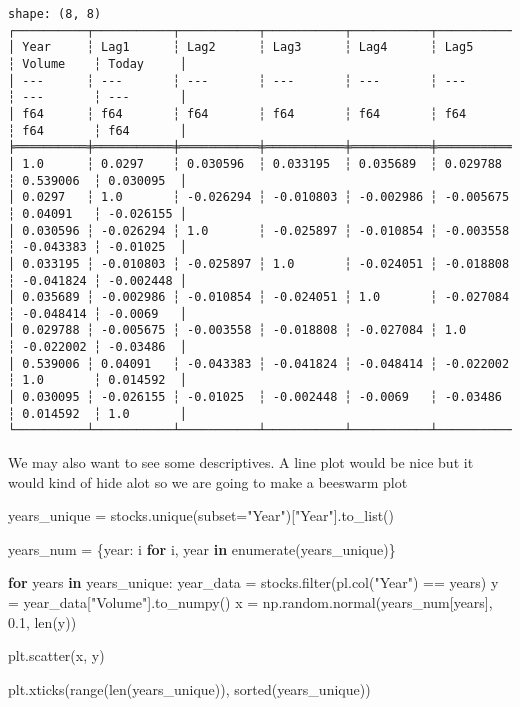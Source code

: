 \documentclass[
  letterpaper,
  DIV=11,
  numbers=noendperiod]{scrreprt}
\newenvironment{Shaded}{\begin{snugshade}}{\end{snugshade}}
\newcommand{\BuiltInTok}[1]{\textcolor[rgb]{0.00,0.23,0.31}{#1}}
\newcommand{\ControlFlowTok}[1]{\textcolor[rgb]{0.00,0.23,0.31}{\textbf{#1}}}
\newcommand{\FloatTok}[1]{\textcolor[rgb]{0.68,0.00,0.00}{#1}}
\newcommand{\KeywordTok}[1]{\textcolor[rgb]{0.00,0.23,0.31}{\textbf{#1}}}
\newcommand{\NormalTok}[1]{\textcolor[rgb]{0.00,0.23,0.31}{#1}}
\newcommand{\OperatorTok}[1]{\textcolor[rgb]{0.37,0.37,0.37}{#1}}
\newcommand{\StringTok}[1]{\textcolor[rgb]{0.13,0.47,0.30}{#1}}
\begin{document}
\begin{verbatim}
shape: (8, 8)
┌──────────┬───────────┬───────────┬───────────┬───────────┬───────────┬───────────┬───────────┐
│ Year     ┆ Lag1      ┆ Lag2      ┆ Lag3      ┆ Lag4      ┆ Lag5      ┆ Volume    ┆ Today     │
│ ---      ┆ ---       ┆ ---       ┆ ---       ┆ ---       ┆ ---       ┆ ---       ┆ ---       │
│ f64      ┆ f64       ┆ f64       ┆ f64       ┆ f64       ┆ f64       ┆ f64       ┆ f64       │
╞══════════╪═══════════╪═══════════╪═══════════╪═══════════╪═══════════╪═══════════╪═══════════╡
│ 1.0      ┆ 0.0297    ┆ 0.030596  ┆ 0.033195  ┆ 0.035689  ┆ 0.029788  ┆ 0.539006  ┆ 0.030095  │
│ 0.0297   ┆ 1.0       ┆ -0.026294 ┆ -0.010803 ┆ -0.002986 ┆ -0.005675 ┆ 0.04091   ┆ -0.026155 │
│ 0.030596 ┆ -0.026294 ┆ 1.0       ┆ -0.025897 ┆ -0.010854 ┆ -0.003558 ┆ -0.043383 ┆ -0.01025  │
│ 0.033195 ┆ -0.010803 ┆ -0.025897 ┆ 1.0       ┆ -0.024051 ┆ -0.018808 ┆ -0.041824 ┆ -0.002448 │
│ 0.035689 ┆ -0.002986 ┆ -0.010854 ┆ -0.024051 ┆ 1.0       ┆ -0.027084 ┆ -0.048414 ┆ -0.0069   │
│ 0.029788 ┆ -0.005675 ┆ -0.003558 ┆ -0.018808 ┆ -0.027084 ┆ 1.0       ┆ -0.022002 ┆ -0.03486  │
│ 0.539006 ┆ 0.04091   ┆ -0.043383 ┆ -0.041824 ┆ -0.048414 ┆ -0.022002 ┆ 1.0       ┆ 0.014592  │
│ 0.030095 ┆ -0.026155 ┆ -0.01025  ┆ -0.002448 ┆ -0.0069   ┆ -0.03486  ┆ 0.014592  ┆ 1.0       │
└──────────┴───────────┴───────────┴───────────┴───────────┴───────────┴───────────┴───────────┘
\end{verbatim}

We may also want to see some descriptives. A line plot would be nice but
it would kind of hide alot so we are going to make a beeswarm plot

\begin{Shaded}
\begin{Highlighting}[]
\NormalTok{years\_unique }\OperatorTok{=}\NormalTok{ stocks.unique(subset}\OperatorTok{=}\StringTok{"Year"}\NormalTok{)[}\StringTok{"Year"}\NormalTok{].to\_list()}

\NormalTok{years\_num }\OperatorTok{=}\NormalTok{ \{year: i }\ControlFlowTok{for}\NormalTok{ i, year }\KeywordTok{in} \BuiltInTok{enumerate}\NormalTok{(years\_unique)\}}

\ControlFlowTok{for}\NormalTok{ years }\KeywordTok{in}\NormalTok{ years\_unique:}
\NormalTok{    year\_data }\OperatorTok{=}\NormalTok{ stocks.}\BuiltInTok{filter}\NormalTok{(pl.col(}\StringTok{"Year"}\NormalTok{) }\OperatorTok{==}\NormalTok{ years)}
\NormalTok{    y }\OperatorTok{=}\NormalTok{ year\_data[}\StringTok{"Volume"}\NormalTok{].to\_numpy()}
\NormalTok{    x }\OperatorTok{=}\NormalTok{ np.random.normal(years\_num[years], }\FloatTok{0.1}\NormalTok{, }\BuiltInTok{len}\NormalTok{(y))}

\NormalTok{    plt.scatter(x, y)}


\NormalTok{plt.xticks(}\BuiltInTok{range}\NormalTok{(}\BuiltInTok{len}\NormalTok{(years\_unique)), }\BuiltInTok{sorted}\NormalTok{(years\_unique))}
\end{Highlighting}
\end{Shaded}
\end{document}
